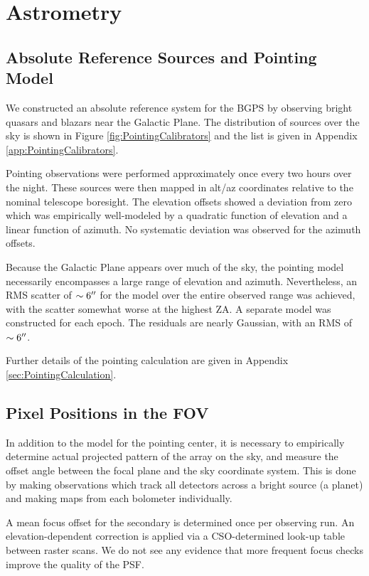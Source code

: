 \documentclass[12pt,preprint]{aastex}
\begin{document}
\section{Astrometry}
\label{sec:Astrometry}

\subsection{Absolute Reference Sources and Pointing Model}

We constructed an absolute reference system for the BGPS by observing
bright quasars and blazars near the Galactic Plane.  The distribution
of sources over the sky is shown in Figure
\ref{fig:PointingCalibrators} and the list is given in Appendix
\ref{app:PointingCalibrators}.

Pointing observations were performed approximately once every two
hours over the night.  These sources were then mapped in alt/az
coordinates relative to the nominal telescope boresight.  The
elevation offsets showed a deviation from zero which was empirically
well-modeled by a quadratic function of elevation and a linear
function of azimuth.  No systematic deviation was observed for the
azimuth offsets.  

Because the Galactic Plane appears over much of the sky, the pointing
model necessarily encompasses a large range of elevation and azimuth.
Nevertheless, an RMS scatter of $\sim 6\mbox{$^{\prime\prime}$}$ for the model over the
entire observed range was achieved, with the scatter somewhat worse at
the highest ZA.  A separate model was constructed for each epoch.  The
residuals are nearly Gaussian, with an RMS of $\sim6\mbox{$^{\prime\prime}$}$.  

Further details of the pointing calculation are given in Appendix
\ref{sec:PointingCalculation}.

\subsection{Pixel Positions in the FOV}

In addition to the model for the pointing center, it is necessary to
empirically determine actual projected pattern of the array on the
sky, and measure the offset angle between the focal plane and the sky
coordinate system.  This is done by making observations which track
all detectors across a bright source (a planet) and making maps from each
bolometer individually.

A mean focus offset for the secondary is determined once per observing
run.  An elevation-dependent correction is applied via a
CSO-determined look-up table between raster scans.  We do not see any
evidence that more frequent focus checks improve the quality of the
PSF.
\end{document}
